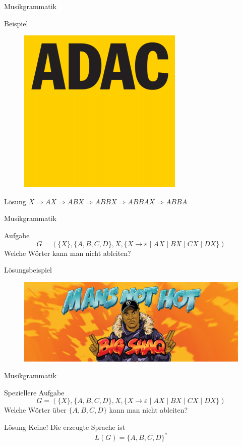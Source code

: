 \begin{frame}{Musikgrammatik}
\begin{exampleblock}{Beispiel}
\begin{figure}[h!]
			\includegraphics[scale=0.26]{../figures/ADAC-Logo.png} \pause
		\end{figure} 
	
\end{exampleblock}

\begin{block}{Lösung}
		$X \Rightarrow AX \Rightarrow ABX \Rightarrow ABBX \Rightarrow ABBAX \Rightarrow ABBA$	
\end{block}
		
\end{frame}

\begin{frame}{Musikgrammatik}
	\begin{exampleblock}{Aufgabe}
		\[G = (\{X\}, \{A, B, C, D\}, X, \{X \to \varepsilon \mid AX \mid BX \mid CX \mid DX\})\]	
		Welche Wörter kann man nicht ableiten?
	\end{exampleblock}
\pause
	\begin{block}{Lösungsbeispiel}
		\centering
		\begin{figure}
			\includegraphics[scale=0.3]{../figures/bigshaq}
		\end{figure}
	\end{block}
\end{frame}

\begin{frame}{Musikgrammatik}
	\begin{exampleblock}{Speziellere Aufgabe}
		\[G = (\{X\}, \{A, B, C, D\}, X, \{X \to \varepsilon \mid AX \mid BX \mid CX \mid DX\})\]	
		Welche Wörter über $\{A, B, C, D\}$ kann man nicht ableiten?
	\end{exampleblock}
\pause
	\begin{block}{Lösung}
		Keine! Die erzeugte Sprache ist
		$$L(G) = \{A,B,C,D\}^\ast$$
	\end{block}
\end{frame}

